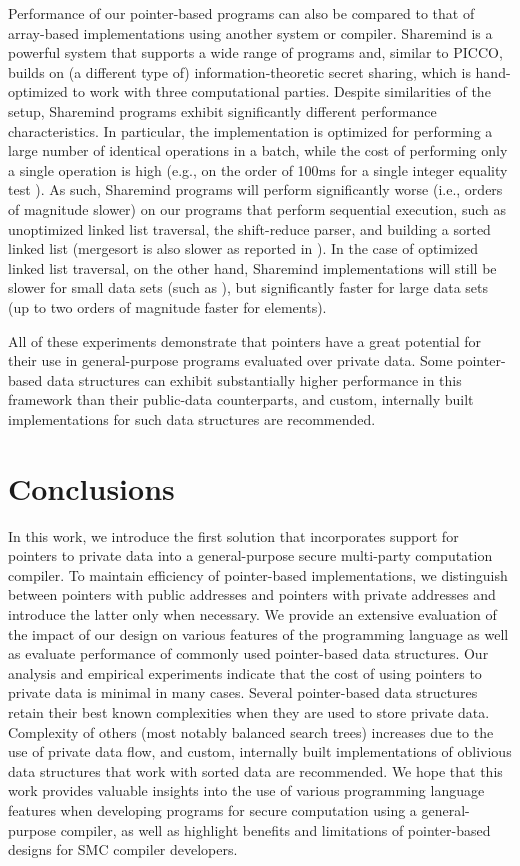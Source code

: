 \documentclass[11pt]{article}
\begin{document}
Performance of our pointer-based programs can also be compared to that of
array-based implementations using another system or compiler. Sharemind
\cite{Bogdanov08} is a powerful system that supports a wide range of
programs and, similar to PICCO, builds on (a different type of)
information-theoretic secret sharing, which is hand-optimized to work with
three computational parties. Despite similarities of the setup, Sharemind
programs exhibit significantly different performance characteristics. In
particular, the implementation is optimized for performing a large number of
identical operations in a batch, while the cost of performing only a single
operation is high (e.g., on the order of 100ms for a single integer equality
test \cite{bog12}). As such, Sharemind programs will perform significantly
worse (i.e., orders of magnitude slower) on our programs that perform
sequential execution, such as unoptimized linked list traversal, the
shift-reduce parser, and building a sorted linked list (mergesort is also
slower as reported in \cite{zha13}). In the case of optimized linked list
traversal, on the other hand, Sharemind implementations will still be slower
for small data sets (such as ), but significantly faster for large data
sets (up to two orders of magnitude faster for  elements).

All of these experiments demonstrate that pointers have a great potential
for their use in general-purpose programs evaluated over private data. Some
pointer-based data structures can exhibit substantially higher performance
in this framework than their public-data counterparts, and custom,
internally built implementations for such data structures are recommended. 

\section{Conclusions} 
\label{sec:conclusions}

In this work, we introduce the first solution that incorporates support for
pointers to private data into a general-purpose secure multi-party
computation compiler. To maintain efficiency of pointer-based
implementations, we distinguish between pointers with public addresses and
pointers with private addresses and introduce the latter only when
necessary. We provide an extensive evaluation of the impact of our design on
various features of the programming language as well as evaluate performance
of commonly used pointer-based data structures. Our analysis and empirical
experiments indicate that the cost of using pointers to private data is
minimal in many cases. Several pointer-based data structures retain their
best known complexities when they are used to store private data. Complexity
of others (most notably balanced search trees) increases due to the use of
private data flow, and custom, internally built implementations of oblivious
data structures that work with sorted data are recommended. We hope that
this work provides valuable insights into the use of various programming
language features when developing programs for secure computation using a
general-purpose compiler, as well as highlight benefits and limitations of
pointer-based designs for SMC compiler developers.
\end{document}
